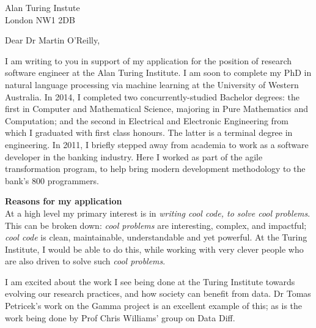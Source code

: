\documentclass[]{letter}
\newcommand{\section}[1]{\textbf{#1}\\}
\begin{document}
\pagestyle{empty}

\begin{letter}{Alan Turing Instute\\London NW1 2DB}
\signature{Lyndon White}
\address{Lyndon White\\ Dept Electrical, Electronic\\ and Computer Engineering\\ The University of\\ Western Australia\\ 35 Stirling Highway\\ Crawley, Perth}
\opening{Dear Dr Martin O'Reilly,}
I am writing to you in support of my application for the position of research software engineer at the Alan Turing Institute.
I am soon to complete my PhD in natural language processing via machine learning at the University of Western Australia.
In 2014, I completed two concurrently-studied Bachelor degrees: the first in Computer and Mathematical Science, majoring in Pure Mathematics and Computation; and the second in Electrical and Electronic Engineering from which I graduated with first class honours.
The latter is a terminal degree in engineering.
In 2011, I briefly stepped away from academia to work as a software developer in the banking industry.
Here I worked as part of the agile transformation program, to help bring modern development methodology to the bank's 800 programmers.

\section{Reasons for my application}
At a high level my primary interest is in 
\emph{writing cool code, to solve cool problems}.
This can be broken down:
\emph{cool problems} are interesting, complex, and impactful;
\emph{cool code} is clean, maintainable, understandable and yet powerful.
At the Turing Institute, I would be able to do this,
while working with very clever people who are also driven to solve such \emph{cool problems}.

I am excited about  the work I see being done at the Turing Institute towards evolving our research practices, and how society can benefit from data.
Dr Tomas Petricek's work on the Gamma project is an excellent example of this; as is the work being done by  Prof Chris Williams' group on Data Diff.



\end{letter}
\end{document}
